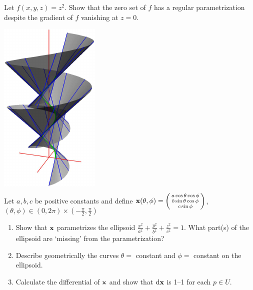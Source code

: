 \begin{exercises}
\begin{enumerate}
\begin{minipage}[t]{0.77\linewidth}
	    	
	  	\item Let $f(x,y,z)=z^2$. Show that the zero set of $f$ has a regular parametrization despite  the gradient of $f$ vanishing at $z=0$.
	  \end{minipage}
	  \hfill
	  \begin{minipage}[t]{0.21\linewidth}\vspace{-10pt}  			\flushright	\href{http://www.math.uci.edu/~ndonalds/math162a/surfaces-tandev.html}{\includegraphics{surfaces-tandev}}
	  \end{minipage}
	  
	
		\item Let $a,b,c$ be positive constants and define ${\mathbf{x}}(\theta,\phi)=\smash{\left(\begin{smallmatrix}a\cos\theta\cos\phi\\b\sin\theta\cos\phi\\c\sin\phi\end{smallmatrix}\right)}$, $(\theta,\phi)\in(0,2\pi)\times(-\frac\pi 2,\frac\pi 2)$
		\begin{enumerate}
			\item Show that ${\mathbf{x}}$ parametrizes the ellipsoid $\frac{x^2}{a^2}+\frac{y^2}{b^2}+\frac{z^2}{c^2}=1$.	What part(s) of the ellipsoid are `missing' from the parametrization?
			\item Describe geometrically the curves $\theta=\,\,$constant and $\phi=\,\,$constant on the ellipsoid.
			\item Calculate the differential of ${\mathbf{x}}$ and show that $\mathrm{d}{\mathbf{x}}$ is 1--1 for each $p\in U$.
		\end{enumerate}
		

\end{enumerate}
\end{exercises}
